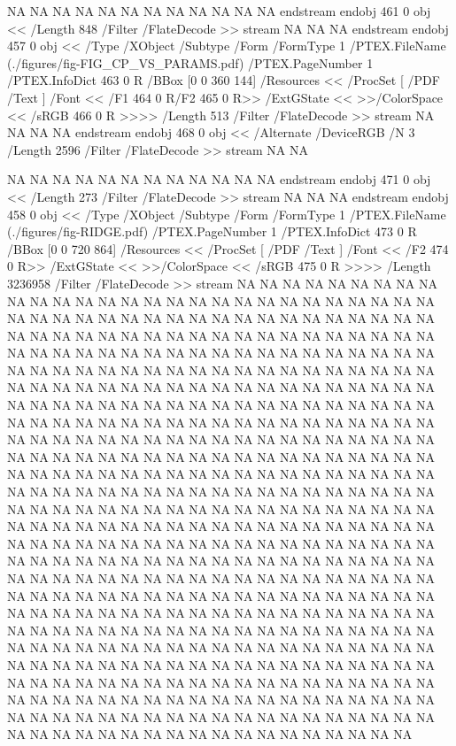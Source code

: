 {NA
NA
NA
NA
NA
NA
NA
NA
NA
NA
NA
NA
endstream
endobj
461 0 obj <<
/Length 848       
/Filter /FlateDecode
>>
stream
NA
NA
NA
endstream
endobj
457 0 obj <<
/Type /XObject
/Subtype /Form
/FormType 1
/PTEX.FileName (./figures/fig-FIG_CP_VS_PARAMS.pdf)
/PTEX.PageNumber 1
/PTEX.InfoDict 463 0 R
/BBox [0 0 360 144]
/Resources <<
/ProcSet [ /PDF /Text ]
/Font << /F1 464 0 R/F2 465 0 R>>
/ExtGState <<
>>/ColorSpace <<
/sRGB 466 0 R
>>>>
/Length 513
/Filter /FlateDecode
>>
stream
NA
NA
NA
NA
endstream
endobj
468 0 obj
<<
/Alternate /DeviceRGB
/N 3
/Length 2596
/Filter /FlateDecode
>>
stream
NA
NA

NA
NA
NA
NA
NA
NA
NA
NA
NA
NA
NA
NA
endstream
endobj
471 0 obj <<
/Length 273       
/Filter /FlateDecode
>>
stream
NA
NA
NA
endstream
endobj
458 0 obj <<
/Type /XObject
/Subtype /Form
/FormType 1
/PTEX.FileName (./figures/fig-RIDGE.pdf)
/PTEX.PageNumber 1
/PTEX.InfoDict 473 0 R
/BBox [0 0 720 864]
/Resources <<
/ProcSet [ /PDF /Text ]
/Font << /F2 474 0 R>>
/ExtGState <<
>>/ColorSpace <<
/sRGB 475 0 R
>>>>
/Length 3236958
/Filter /FlateDecode
>>
stream
NA
NA
NA
NA
NA
NA
NA
NA
NA
NA
NA
NA
NA
NA
NA
NA
NA
NA
NA
NA
NA
NA
NA
NA
NA
NA
NA
NA
NA
NA
NA
NA
NA
NA
NA
NA
NA
NA
NA
NA
NA
NA
NA
NA
NA
NA
NA
NA
NA
NA
NA
NA
NA
NA
NA
NA
NA
NA
NA
NA
NA
NA
NA
NA
NA
NA
NA
NA
NA
NA
NA
NA
NA
NA
NA
NA
NA
NA
NA
NA
NA
NA
NA
NA
NA
NA
NA
NA
NA
NA
NA
NA
NA
NA
NA
NA
NA
NA
NA
NA
NA
NA
NA
NA
NA
NA
NA
NA
NA
NA
NA
NA
NA
NA
NA
NA
NA
NA
NA
NA
NA
NA
NA
NA
NA
NA
NA
NA
NA
NA
NA
NA
NA
NA
NA
NA
NA
NA
NA
NA
NA
NA
NA
NA
NA
NA
NA
NA
NA
NA
NA
NA
NA
NA
NA
NA
NA
NA
NA
NA
NA
NA
NA
NA
NA
NA
NA
NA
NA
NA
NA
NA
NA
NA
NA
NA
NA
NA
NA
NA
NA
NA
NA
NA
NA
NA
NA
NA
NA
NA
NA
NA
NA
NA
NA
NA
NA
NA
NA
NA
NA
NA
NA
NA
NA
NA
NA
NA
NA
NA
NA
NA
NA
NA
NA
NA
NA
NA
NA
NA
NA
NA
NA
NA
NA
NA
NA
NA
NA
NA
NA
NA
NA
NA
NA
NA
NA
NA
NA
NA
NA
NA
NA
NA
NA
NA
NA
NA
NA
NA
NA
NA
NA
NA
NA
NA
NA
NA
NA
NA
NA
NA
NA
NA
NA
NA
NA
NA
NA
NA
NA
NA
NA
NA
NA
NA
NA
NA
NA
NA
NA
NA
NA
NA
NA
NA
NA
NA
NA
NA
NA
NA
NA
NA
NA
NA
NA
NA
NA
NA
NA
NA
NA
NA
NA
NA
NA
NA
NA
NA
NA
NA
NA
NA
NA
NA
NA
NA
NA
NA
NA
NA
NA
NA
NA
NA
NA
NA
NA
NA
NA
NA
NA
NA
NA
NA
NA
NA
NA
NA
NA
NA
NA
NA
NA
NA
NA
NA
NA
NA
NA
NA
NA
NA
NA
NA
NA
NA
NA
NA
NA
NA
NA
NA
NA
NA
NA
NA
NA
NA
NA
NA
NA
NA
NA
NA
NA
NA
NA
NA
NA
NA
NA
NA
NA
NA
NA
NA
NA
NA
NA
NA
NA
NA
NA
NA
NA
NA
NA
NA
NA
NA
NA
NA
NA
NA
NA
NA
NA
NA
NA
NA
NA
NA
NA
NA
NA
NA
NA
NA
NA
NA
NA
NA
NA
NA
NA
NA
NA
NA
NA
NA
NA
NA
NA
NA
NA
NA
NA
NA
NA
NA
NA
NA
NA
NA
NA
NA
NA
NA
NA
NA
NA
NA
NA
NA
NA
NA
NA
NA
NA
NA
NA
NA
NA
NA
NA
NA
NA
NA
NA
NA
NA
NA
NA
NA
NA
NA
NA
NA
NA
NA
NA
NA
NA
NA
NA
NA
NA
NA
NA
NA
NA
NA
NA
NA
NA
NA
NA
NA
NA
NA
}
